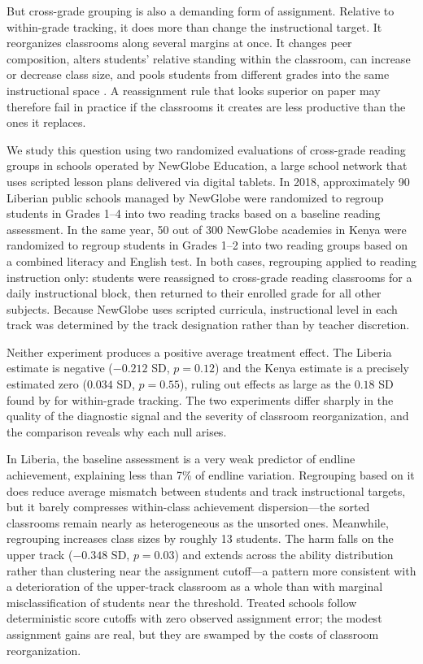 \documentclass[11pt]{article}
\begin{document}
But cross-grade grouping is also a demanding form of assignment. Relative to within-grade tracking, it does more than change the instructional target. It reorganizes classrooms along several margins at once. It changes peer composition, alters students' relative standing within the classroom, can increase or decrease class size, and pools students from different grades into the same instructional space \citep{betts:2011}. A reassignment rule that looks superior on paper may therefore fail in practice if the classrooms it creates are less productive than the ones it replaces.

We study this question using two randomized evaluations of cross-grade reading groups in schools operated by NewGlobe Education, a large school network that uses scripted lesson plans delivered via digital tablets. In 2018, approximately 90 Liberian public schools managed by NewGlobe were randomized to regroup students in Grades 1--4 into two reading tracks based on a baseline reading assessment. In the same year, 50 out of 300 NewGlobe academies in Kenya were randomized to regroup students in Grades 1--2 into two reading groups based on a combined literacy and English test. In both cases, regrouping applied to reading instruction only: students were reassigned to cross-grade reading classrooms for a daily instructional block, then returned to their enrolled grade for all other subjects. Because NewGlobe uses scripted curricula, instructional level in each track was determined by the track designation rather than by teacher discretion. 

Neither experiment produces a positive average treatment effect. The Liberia estimate is negative ($-0.212$ SD, $p = 0.12$) and the Kenya estimate is a precisely estimated zero ($0.034$ SD, $p = 0.55$), ruling out effects as large as the $0.18$ SD found by \citet{duflo2011peer} for within-grade tracking. The two experiments differ sharply in the quality of the diagnostic signal and the severity of classroom reorganization, and the comparison reveals why each null arises.

In Liberia, the baseline assessment is a very weak predictor of endline achievement, explaining less than 7\% of endline variation. Regrouping based on it does reduce average mismatch between students and track instructional targets, but it barely compresses within-class achievement dispersion---the sorted classrooms remain nearly as heterogeneous as the unsorted ones. Meanwhile, regrouping increases class sizes by roughly 13 students. The harm falls on the upper track ($-0.348$ SD, $p = 0.03$) and extends across the ability distribution rather than clustering near the assignment cutoff---a pattern more consistent with a deterioration of the upper-track classroom as a whole than with marginal misclassification of students near the threshold. Treated schools follow deterministic score cutoffs with zero observed assignment error; the modest assignment gains are real, but they are swamped by the costs of classroom reorganization.
\end{document}

